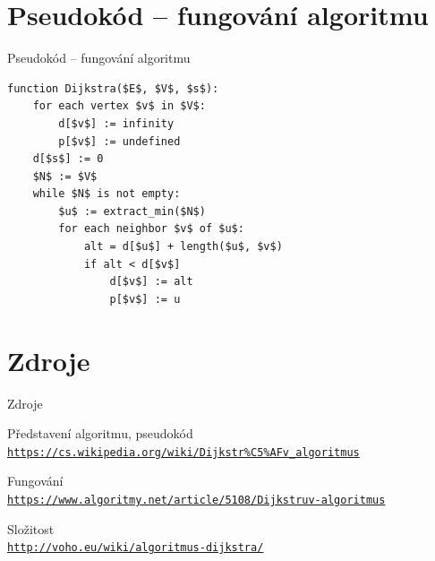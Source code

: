 \documentclass[10pt, hyperref={unicode}]{beamer}
\begin{document}
    \section{Pseudokód -- fungování algoritmu}
    \begin{frame}[fragile]{Pseudokód -- fungování algoritmu}
    \begin{lstlisting}[mathescape=true]
function Dijkstra($E$, $V$, $s$):
    for each vertex $v$ in $V$:
        d[$v$] := infinity  
        p[$v$] := undefined
    d[$s$] := 0
    $N$ := $V$
    while $N$ is not empty:
        $u$ := extract_min($N$)                       
        for each neighbor $v$ of $u$:
            alt = d[$u$] + length($u$, $v$)
            if alt < d[$v$]              
                d[$v$] := alt
                p[$v$] := u
    \end{lstlisting}
    \end{frame}

    \section{Zdroje}
    \begin{frame}{Zdroje}
        \begin{thebibliography}{3}
		\bibitem{} Představení algoritmu, pseudokód\\
		\texttt{\footnotesize{\url{https://cs.wikipedia.org/wiki/Dijkstr\%C5\%AFv\_algoritmus}}}

		\bibitem{} Fungování\\
		\texttt{\footnotesize{\url{https://www.algoritmy.net/article/5108/Dijkstruv-algoritmus}}}
		
		\bibitem{} Složitost\\
		\texttt{\footnotesize{\url{http://voho.eu/wiki/algoritmus-dijkstra/}}}
	\end{thebibliography}
    \end{frame}
    
\end{document}
